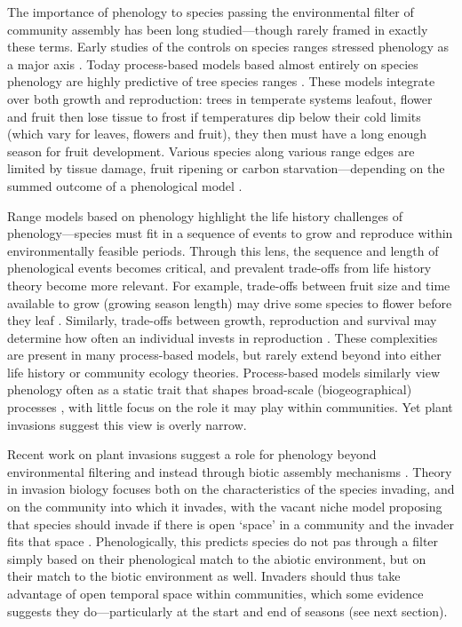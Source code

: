 \documentclass[11pt]{article}
\begin{document}

The importance of phenology to species passing the environmental filter of community assembly has been long studied---though rarely framed in exactly these terms. Early studies of the controls on species ranges stressed phenology as a major axis \citep{salisbury1926geographical}. Today process-based models based almost entirely on species phenology are highly predictive of tree species ranges \citep[where they have been tested,][]{chuineJTB,Morin:2009gt,morin2007}. These models integrate over both growth and reproduction: trees in temperate systems leafout, flower and fruit then lose tissue to frost if temperatures dip below their cold limits (which vary for leaves, flowers and fruit), they then must have a long enough season for fruit development. Various species along various range edges are limited by tissue damage, fruit ripening or carbon starvation---depending on the summed outcome of a phenological model \citep{Chuine:2010gm}. 

Range models based on phenology highlight the life history challenges of phenology---species must fit in a sequence of events to grow and reproduce within environmentally feasible periods. Through this lens, the sequence and length of phenological events becomes critical, and prevalent trade-offs from life history theory become more relevant. For example, trade-offs between fruit size and time available to grow (growing season length) may drive some species to flower before they leaf \citep{dan2021nph}. Similarly, trade-offs between growth, reproduction and survival may determine how often an individual invests in reproduction \citep{schaffer1974optimal,law1979cost,stearns1998evolution}. These complexities are present in many process-based models, but rarely extend beyond into either life history or community ecology theories. Process-based models similarly view phenology often as a static trait that shapes broad-scale (biogeographical) processes \citep{Chuine:2010gm}, with little focus on the role it may play within communities. Yet plant invasions suggest this view is overly narrow.

Recent work on plant invasions suggest a role for phenology beyond environmental filtering and instead through biotic assembly mechanisms \citep{wolkovich2011phenology,Fridley:2012fj}. Theory in invasion biology focuses both on the characteristics of the species invading, and on the community into which it invades, with the vacant niche model proposing that species should invade if there is open `space' in a community and the invader fits that space \citep{Elton:1958bk}. Phenologically, this predicts species do not pas through a filter simply based on their phenological match to the abiotic environment, but on their match to the biotic environment as well. Invaders should thus take advantage of open temporal space within communities, which some evidence suggests they do---particularly at the start and end of seasons (see next section). 
\end{document}
